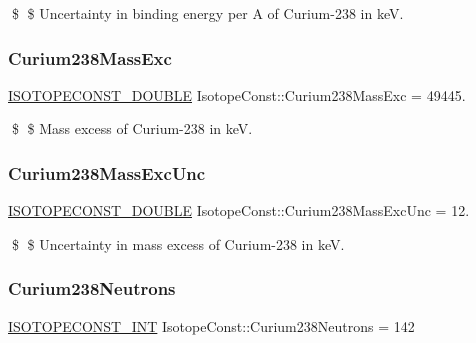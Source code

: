 \$ \$ Uncertainty in binding energy per A of Curium-\/238 in keV. \mbox{\label{group___isotope_const-_curium-_cm238_ga617116961b7507a018e08f7fa5ddaca4}} 
\subsubsection{\texorpdfstring{Curium238\+Mass\+Exc}{Curium238MassExc}}
{\footnotesize\ttfamily \mbox{\hyperlink{group___isotope_const-_macros_ga8f45a7272ce02c0b4c65c44636ed719a}{I\+S\+O\+T\+O\+P\+E\+C\+O\+N\+S\+T\+\_\+\+D\+O\+U\+B\+LE}} Isotope\+Const\+::\+Curium238\+Mass\+Exc = 49445.}

\$ \$ Mass excess of Curium-\/238 in keV. \mbox{\label{group___isotope_const-_curium-_cm238_ga7ca196d65b3bd64586e8055f97a4e2fa}} 
\subsubsection{\texorpdfstring{Curium238\+Mass\+Exc\+Unc}{Curium238MassExcUnc}}
{\footnotesize\ttfamily \mbox{\hyperlink{group___isotope_const-_macros_ga8f45a7272ce02c0b4c65c44636ed719a}{I\+S\+O\+T\+O\+P\+E\+C\+O\+N\+S\+T\+\_\+\+D\+O\+U\+B\+LE}} Isotope\+Const\+::\+Curium238\+Mass\+Exc\+Unc = 12.}

\$ \$ Uncertainty in mass excess of Curium-\/238 in keV. \mbox{\label{group___isotope_const-_curium-_cm238_gacf94a83f1fa9b05a9700602b09dd2223}} 
\subsubsection{\texorpdfstring{Curium238\+Neutrons}{Curium238Neutrons}}
{\footnotesize\ttfamily \mbox{\hyperlink{group___isotope_const-_macros_ga5f18360b3e99483a35c32d789e62621c}{I\+S\+O\+T\+O\+P\+E\+C\+O\+N\+S\+T\+\_\+\+I\+NT}} Isotope\+Const\+::\+Curium238\+Neutrons = 142}

